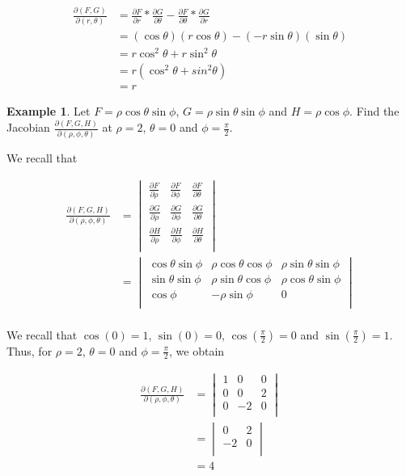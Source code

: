 \documentclass[11pt]{article}
\theoremstyle{plain} %
\theoremstyle{definition}
\theoremstyle{example}
\newtheorem*{example}{Example}
\theoremstyle{remark}
\begin{document}
\begin{align*}
	\frac{\partial (F,G)}{\partial (r, \theta)} &= \frac{\partial F}{\partial r}*\frac{\partial G}{\partial \theta}-\frac{\partial F}{\partial \theta}*\frac{\partial G}{\partial r} \\
	&= (\cos\theta)(r\cos\theta) - (-r\sin\theta)(\sin\theta) \\
	&= r\cos^2\theta + r\sin^2\theta \\
	&= r\left(\cos^2\theta + sin^2 \theta \right )\\
	&= r
\end{align*}

\begin{example}
Let $F=\rho\cos\theta\sin\phi$, $G=\rho\sin\theta\sin\phi$ and $H = \rho\cos\phi$. Find the Jacobian $\frac{\partial (F,G,H)}{\partial (\rho, \phi, \theta)}$ at $\rho = 2$, $\theta = 0$ and $\phi = \frac{\pi}{2}$. 
\end{example}

We recall that 

\begin{align*}
\frac{\partial (F,G,H)}{\partial (\rho, \phi, \theta)} &= 
	\begin{vmatrix}
		\frac{\partial F}{\partial \rho} & \frac{\partial F}{\partial \phi} & \frac{\partial F}{\partial \theta}\\
		\frac{\partial G}{\partial \rho} & \frac{\partial G}{\partial \phi} & \frac{\partial G}{\partial \theta}\\
		\frac{\partial H}{\partial \rho} & \frac{\partial H}{\partial\phi} & \frac{\partial H}{\partial \theta}\\
	\end{vmatrix} \\
	&=\begin{vmatrix}
		\cos\theta\sin\phi & \rho\cos\theta\cos\phi & \rho\sin\theta\sin\phi\\
		\sin\theta\sin\phi & \rho\sin\theta\cos\phi & \rho\cos\theta\sin\phi\\
		\cos\phi & -\rho\sin\phi & 0\\
	\end{vmatrix} \\
\end{align*}

We recall that $\cos(0) = 1$, $\sin(0) = 0$, $\cos(\frac{\pi}{2}) = 0$ and $\sin(\frac{\pi}{2}) = 1$. Thus, for $\rho = 2$, $\theta = 0$ and $\phi = \frac{\pi}{2}$, we obtain

\begin{align*}
\frac{\partial (F,G,H)}{\partial (\rho, \phi, \theta)} &= 
	\begin{vmatrix}
		1 & 0 & 0\\
		0 & 0 & 2\\
		0 & -2 & 0\\
	\end{vmatrix}\\
	&= \begin{vmatrix}
		0 & 2\\
		-2 & 0\\
	\end{vmatrix}\\
	&= 4
\end{align*}
\end{document}
